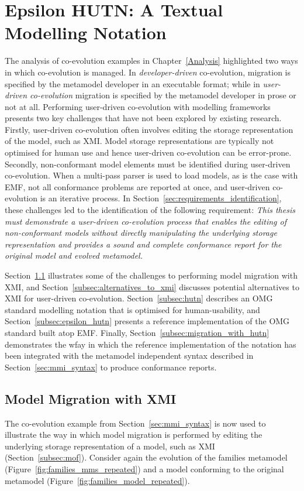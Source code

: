 
\section{Epsilon HUTN: A Textual Modelling Notation}
\label{sec:notation}
The analysis of co-evolution examples in Chapter~\ref{Analysis} highlighted two ways in which co-evolution is managed. In \emph{developer-driven} co-evolution, migration is specified by the metamodel developer in an executable format; while in \emph{user-driven co-evolution} migration is specified by the metamodel developer in prose or not at all. Performing user-driven co-evolution with modelling frameworks presents two key challenges that have not been explored by existing research. Firstly, user-driven co-evolution often involves editing the storage representation of the model, such as XMI. Model storage representations are typically not optimised for human use and hence user-driven co-evolution can be error-prone. Secondly, non-conformant model elements must be identified during user-driven co-evolution. When a multi-pass parser is used to load models, as is the case with EMF, not all conformance problems are reported at once, and user-driven co-evolution is an iterative process. In Section~\ref{sec:requirements_identification}, these challenges led to the identification of the following requirement: \emph{This thesis must demonstrate a user-driven co-evolution process that enables the editing of non-conformant models without directly manipulating the underlying storage representation and provides a sound and complete conformance report for the original model and evolved metamodel.}

Section~\ref{subsec:migration_with_xmi} illustrates some of the challenges to performing model migration with XMI, and Section~\ref{subsec:alternatives_to_xmi} discusses potential alternatives to XMI for user-driven co-evolution. Section~\ref{subsec:hutn} describes an OMG standard modelling notation that is optimised for human-usability, and Section~\ref{subsec:epsilon_hutn} presents a reference implementation of the OMG standard built atop EMF. Finally, Section~\ref{subsec:migration_with_hutn} demonstrates the wƒay in which the reference implementation of the notation has been integrated with the metamodel independent syntax described in Section~\ref{sec:mmi_syntax} to produce conformance reports. 

\subsection{Model Migration with XMI}
\label{subsec:migration_with_xmi}
The co-evolution example from Section~\ref{sec:mmi_syntax} is now used to illustrate the way in which model migration is performed by editing the underlying storage representation of a model, such as XMI (Section~\ref{subsec:mof}). Consider again the evolution of the families metamodel (Figure~\ref{fig:families_mms_repeated}) and a model conforming to the original metamodel (Figure~\ref{fig:families_model_repeated}).

